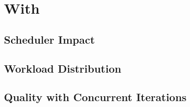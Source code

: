 \documentclass[main.tex]{subfiles}
\begin{document}
\section{With \starpu}
\subsection{Scheduler Impact}

\subsection{Workload Distribution}

\subsection{Quality with Concurrent Iterations}
\end{document}
